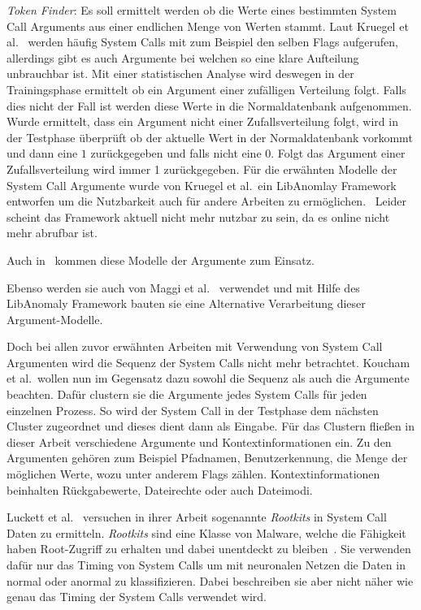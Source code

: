        \textit{Token Finder}: Es soll ermittelt werden ob die Werte eines bestimmten System Call Arguments aus einer endlichen Menge von Werten stammt.
        Laut Kruegel et al.~\cite{ARGUMENTS} werden häufig System Calls mit zum Beispiel den selben Flags aufgerufen, allerdings gibt es auch Argumente bei welchen so eine klare Aufteilung unbrauchbar ist.
        Mit einer statistischen Analyse wird deswegen in der Trainingsphase ermittelt ob ein Argument einer zufälligen Verteilung folgt.
        Falls dies nicht der Fall ist werden diese Werte in die Normaldatenbank aufgenommen.
        Wurde ermittelt, dass ein Argument nicht einer Zufallsverteilung folgt, wird in der Testphase überprüft ob der aktuelle Wert in der Normaldatenbank vorkommt und dann eine $1$ zurückgegeben und falls nicht eine $0$.
        Folgt das Argument einer Zufallsverteilung wird immer 1 zurückgegeben.
        Für die erwähnten Modelle der System Call Argumente wurde von Kruegel et al.\ ein LibAnomlay Framework entworfen um die Nutzbarkeit auch für andere Arbeiten zu ermöglichen.~\cite{ARGUMENTS}
        Leider scheint das Framework aktuell nicht mehr nutzbar zu sein, da es online nicht mehr abrufbar ist.

        Auch in~\cite{ARGUMENTS2} kommen diese Modelle der Argumente zum Einsatz.
        
        Ebenso werden sie auch von Maggi et al.~\cite{MAGGI} verwendet und mit Hilfe des LibAnomaly Framework bauten sie eine Alternative Verarbeitung dieser Argument-Modelle.

        Doch bei allen zuvor erwähnten Arbeiten mit Verwendung von System Call Argumenten wird die Sequenz der System Calls nicht mehr betrachtet.
        Koucham et al.\ wollen nun im Gegensatz dazu sowohl die Sequenz als auch die Argumente beachten.
        Dafür clustern sie die Argumente jedes System Calls für jeden einzelnen Prozess.
        So wird der System Call in der Testphase dem nächsten Cluster zugeordnet und dieses dient dann als Eingabe.
        Für das Clustern fließen in dieser Arbeit verschiedene Argumente und Kontextinformationen ein.
        Zu den Argumenten gehören zum Beispiel Pfadnamen, Benutzerkennung, die Menge der möglichen Werte, wozu unter anderem Flags zählen.
        Kontextinformationen beinhalten Rückgabewerte, Dateirechte oder auch Dateimodi.~\cite{ARGUMENTCLUSTERKOUCHAM2015}

        Luckett et al.~\cite{TIMINGLUCKETT2016} versuchen in ihrer Arbeit sogenannte \textit{Rootkits} in System Call Daten zu ermitteln.
        \textit{Rootkits} sind eine Klasse von Malware, welche die Fähigkeit haben Root-Zugriff zu erhalten und dabei unentdeckt zu bleiben~\cite{OSSECBRAY2008}.
        Sie verwenden dafür nur das Timing von System Calls um mit neuronalen Netzen die Daten in normal oder anormal zu klassifizieren.
        Dabei beschreiben sie aber nicht näher wie genau das Timing der System Calls verwendet wird.

